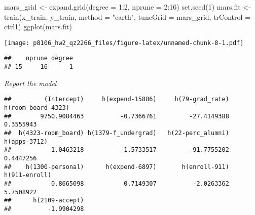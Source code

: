 \documentclass[
]{article}
\newenvironment{Shaded}{\begin{snugshade}}{\end{snugshade}}
\newcommand{\AttributeTok}[1]{\textcolor[rgb]{0.77,0.63,0.00}{#1}}
\newcommand{\CommentTok}[1]{\textcolor[rgb]{0.56,0.35,0.01}{\textit{#1}}}
\newcommand{\DecValTok}[1]{\textcolor[rgb]{0.00,0.00,0.81}{#1}}
\newcommand{\FunctionTok}[1]{\textcolor[rgb]{0.00,0.00,0.00}{#1}}
\newcommand{\NormalTok}[1]{#1}
\newcommand{\OtherTok}[1]{\textcolor[rgb]{0.56,0.35,0.01}{#1}}
\newcommand{\SpecialCharTok}[1]{\textcolor[rgb]{0.00,0.00,0.00}{#1}}
\newcommand{\StringTok}[1]{\textcolor[rgb]{0.31,0.60,0.02}{#1}}
\begin{document}
\begin{Shaded}
\begin{Highlighting}[]
\NormalTok{mars\_grid }\OtherTok{\textless{}{-}} \FunctionTok{expand.grid}\NormalTok{(}\AttributeTok{degree =} \DecValTok{1}\SpecialCharTok{:}\DecValTok{2}\NormalTok{, }
                         \AttributeTok{nprune =} \DecValTok{2}\SpecialCharTok{:}\DecValTok{16}\NormalTok{)}
\FunctionTok{set.seed}\NormalTok{(}\DecValTok{1}\NormalTok{)}
\NormalTok{mars.fit }\OtherTok{\textless{}{-}} \FunctionTok{train}\NormalTok{(x\_train, y\_train,}
                 \AttributeTok{method =} \StringTok{"earth"}\NormalTok{,}
                 \AttributeTok{tuneGrid =}\NormalTok{ mars\_grid,}
                 \AttributeTok{trControl =}\NormalTok{ ctrl1)}
\FunctionTok{ggplot}\NormalTok{(mars.fit)}
\end{Highlighting}
\end{Shaded}

\texttt{[image: p8106\_hw2\_qz2266\_files/figure-latex/unnamed-chunk-8-1.pdf]}

\begin{Shaded}
\end{Shaded}

\begin{verbatim}
##    nprune degree
## 15     16      1
\end{verbatim}

\emph{Report the model}

\begin{Shaded}
\end{Shaded}

\begin{verbatim}
##         (Intercept)     h(expend-15886)     h(79-grad_rate)  h(room_board-4323) 
##        9750.9084463          -0.7366761         -27.4149388           0.3555943 
##  h(4323-room_board) h(1379-f_undergrad)   h(22-perc_alumni)        h(apps-3712) 
##          -1.0463218          -1.5733517         -91.7755202           0.4447256 
##    h(1300-personal)      h(expend-6897)       h(enroll-911)       h(911-enroll) 
##           0.8665098           0.7149307          -2.0263362           5.7508922 
##      h(2109-accept) 
##          -1.9904298
\end{verbatim}
\end{document}
